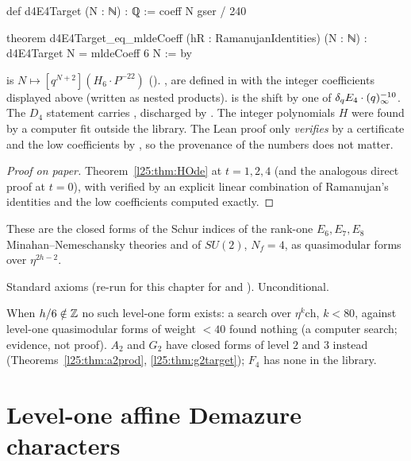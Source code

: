 \begin{leancode}
def d4E4Target (N : ℕ) : ℚ := coeff N gser / 240

theorem d4E4Target_eq_mldeCoeff (hR : RamanujanIdentities) (N : ℕ) :
    d4E4Target N = mldeCoeff 6 N := by
\end{leancode}
\begin{dictionary}
 is $N\mapsto[q^{N+2}](H_6\cdot P^{-22})$ (). ,  are defined in
 with the integer coefficients displayed above (written as nested products).
 is the shift by one of $\delta_q E_4\cdot(q)_\infty^{-10}$. The $D_4$ statement carries , discharged by
. The integer polynomials $H$ were found by a computer fit outside the library. The Lean proof
only \emph{verifies}  by a certificate and the low coefficients by , so the provenance of the
numbers does not matter.
\end{dictionary}
\begin{proof}[Proof on paper]
Theorem~\ref{l25:thm:HOde} at $t=1,2,4$ (and the analogous direct proof at $t=0$), with  verified by an
explicit linear combination of Ramanujan's identities and the low coefficients computed exactly.
\end{proof}
\begin{physics}
These are the closed forms of the Schur indices of the rank-one $E_6,E_7,E_8$ Minahan--Nemeschansky theories and of
$SU(2)$, $N_f=4$, as quasimodular forms over $\eta^{2h-2}$.
\end{physics}
\begin{status}
Standard axioms (re-run for this chapter for  and ).
Unconditional.
\end{status}

\begin{remark}
When $h/6\notin{\mathbb{Z}}$ no such level-one form exists: a search over $\eta^k\mathrm{ch}$, $k<80$, against level-one
quasimodular forms of weight $<40$ found nothing (a computer search; evidence, not proof). $A_2$ and $G_2$ have closed forms of
level $2$ and $3$ instead (Theorems~\ref{l25:thm:a2prod}, \ref{l25:thm:g2target}); $F_4$ has none in the library.
\end{remark}

\section{Level-one affine Demazure characters}\label{l25:sec:demazure}

